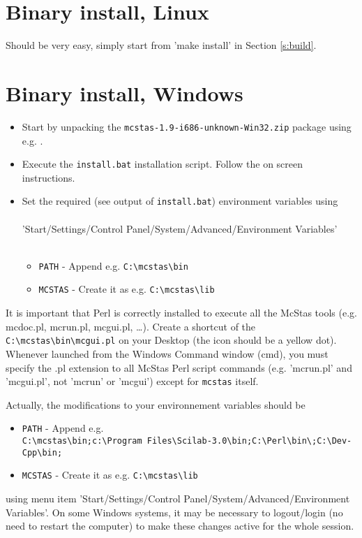 \section{Binary install, Linux}
\label{s:linbin}
Should be very easy, simply start from 'make install' in Section \ref{s:build}.

\section{Binary install, Windows}
\label{s:winbin}
\begin{itemize}
\item{Start by unpacking the \texttt{mcstas-1.9-i686-unknown-Win32.zip} package using
e.g. .}
\item{Execute the \texttt{install.bat} installation script. Follow the
  on screen instructions.}
\item{Set the required (see output of \texttt{install.bat}) environment variables using
\\\ \\
\noindent 'Start/Settings/Control Panel/System/Advanced/Environment
Variables'\\\
  \begin{itemize}
    \item{\verb+PATH+  - Append e.g. \verb+C:\mcstas\bin+}
    \item{\verb+MCSTAS+  - Create it as e.g. \verb+C:\mcstas\lib+}
  \end{itemize}}
\end{itemize}
It is important that Perl is correctly installed to execute all the McStas tools (e.g. mcdoc.pl, mcrun.pl, mcgui.pl, \ldots). Create a shortcut of the \verb+C:\mcstas\bin\mcgui.pl+ on your Desktop (the icon should be a yellow dot). Whenever launched from the Windows Command window (cmd), you must specify the .pl extension to all McStas Perl script commands (e.g. 'mcrun.pl' and 'mcgui.pl', not 'mcrun' or 'mcgui') except for \verb+mcstas+ itself.

Actually, the modifications to your environnement variables should be
\begin{itemize}
    \item{\verb+PATH+ - Append e.g. \\
    \verb+C:\mcstas\bin;c:\Program Files\Scilab-3.0\bin;C:\Perl\bin\;C:\Dev-Cpp\bin;+}
    \item{\verb+MCSTAS+ - Create it as e.g. \verb+C:\mcstas\lib+}
\end{itemize}
using menu item 'Start/Settings/Control Panel/System/Advanced/Environment Variables'. On some Windows systems, it may be necessary to logout/login (no need to restart the computer) to make these changes active for the whole session.

